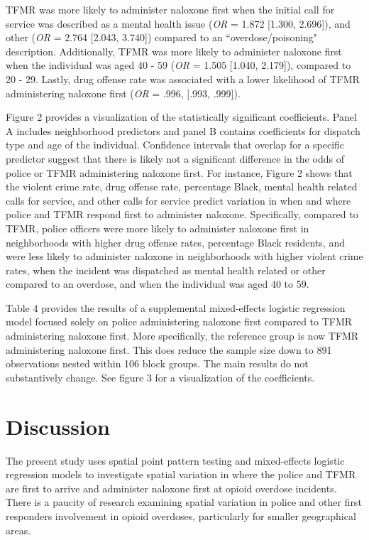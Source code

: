 TFMR was more likely to administer naloxone first when the initial call for service was described as a mental health issue (\textit{OR} = 1.872 [1.300, 2.696]), and other (\textit{OR} = 2.764 [2.043, 3.740]) compared to an ``overdose/poisoning" description. Additionally, TFMR was more likely to administer naloxone first when the individual was aged 40 - 59 (\textit{OR} = 1.505 [1.040, 2.179]), compared to 20 - 29. Lastly, drug offense rate was associated with a lower likelihood of TFMR administering naloxone first (\textit{OR} = .996, [.993, .999]). 

Figure 2 provides a visualization of the statistically significant coefficients. Panel A includes neighborhood predictors and panel B contains coefficients for dispatch type and age of the individual. Confidence intervals that overlap for a specific predictor suggest that there is likely not a significant difference in the odds of police or TFMR administering naloxone first. For instance, Figure 2 shows that the violent crime rate, drug offense rate, percentage Black, mental health related calls for service, and other calls for service predict variation in when and where police and TFMR respond first to administer naloxone. Specifically, compared to TFMR, police officers were more likely to administer naloxone first in neighborhoods with higher drug offense rates, percentage Black residents, and were less likely to administer naloxone in neighborhoods with higher violent crime rates, when the incident was dispatched as mental health related or other compared to an overdose, and when the individual was aged 40 to 59.

Table 4 provides the results of a supplemental mixed-effects logistic regression model focused solely on police administering naloxone first compared to TFMR administering naloxone first. More specifically, the reference group is now TFMR administering naloxone first. This does reduce the sample size down to 891 observations nested within 106 block groups. The main results do not substantively change. See figure 3 for a visualization of the coefficients.

\section{\centering Discussion}
The present study uses spatial point pattern testing and mixed-effects logistic regression models to investigate spatial variation in where the police and TFMR are first to arrive and administer naloxone first at opioid overdose incidents. There is a paucity of research examining spatial variation in police and other first responders involvement in opioid overdoses, particularly for smaller geographical areas. 

